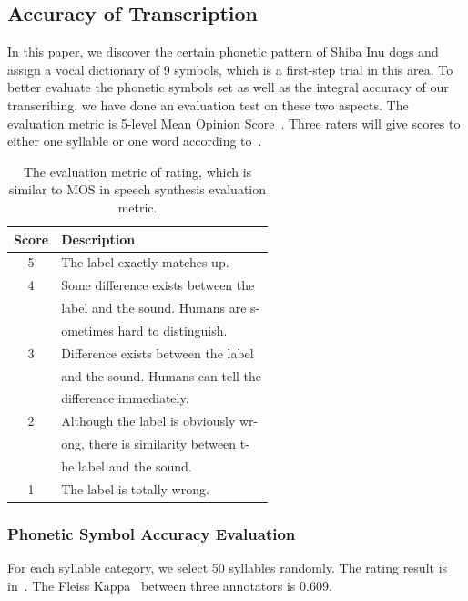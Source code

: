 \subsection{Accuracy of Transcription}
In this paper, we discover the certain phonetic pattern of Shiba Inu dogs and assign a vocal dictionary of 9 symbols, which is a first-step trial in this area. To better evaluate the phonetic symbols set as well as the integral accuracy of our transcribing, we have done an evaluation test on these two aspects. The evaluation metric is 5-level Mean Opinion Score~\cite{viswanathan2005measuring}. Three raters will give scores to either one syllable or one word according to~. %


\begin{table}[th]
\centering
\small
\begin{tabular}{c|l}
\hline
\textbf{Score} & \textbf{Description} \\
\hline
5 & The label exactly matches up.\\
4 & Some difference exists between the\\
{}& label and the sound. Humans are s- \\
  & ometimes hard to distinguish.\\
3 & Difference exists between the label\\
  & and the sound. Humans can tell the \\
  & difference immediately.\\
2 & Although the label is obviously wr-\\
{}& ong, there is similarity between t-\\
{}& he label and the sound.\\
1 & The label is totally wrong. \\
\hline
\end{tabular}
\caption{The evaluation metric of rating, which is similar to MOS in speech synthesis evaluation metric.}
\label{tab:ratestandard}
\end{table}

\subsubsection{Phonetic Symbol Accuracy Evaluation}
\label{sec:phone_eva}
For each syllable category, we select 50 syllables randomly. The rating result is in~. The Fleiss Kappa~\cite{kilicc2015kappa} between three annotators is 0.609.

